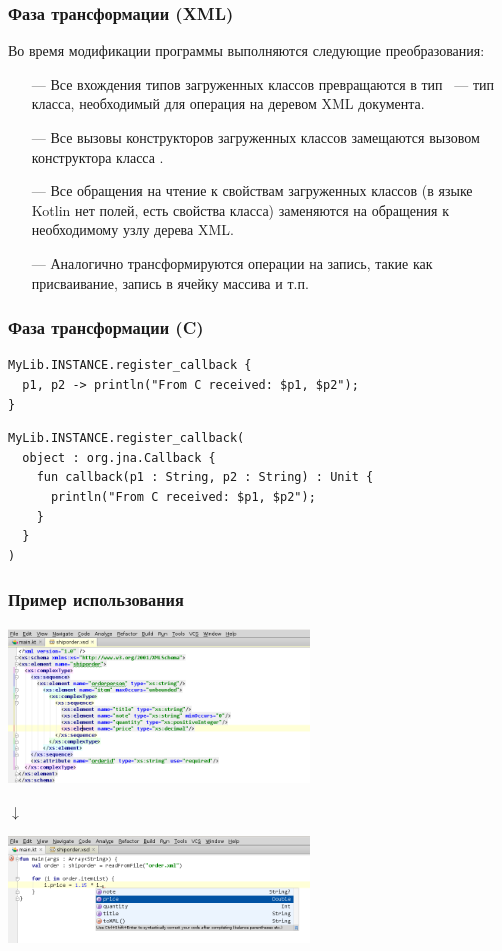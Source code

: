 \documentclass[12pt]{beamer}
\begin{document}
\begin{frame}\frametitle{Фаза трансформации (XML)}
Во время модификации программы выполняются следующие преобразования:
\begin{itemize}
\item[---] Все вхождения типов загруженных классов превращаются в тип ~--- тип класса, необходимый для операция на деревом XML документа.
\item[---] Все вызовы конструкторов загруженных классов замещаются вызовом конструктора класса .
\item[---] Все обращения на чтение к свойствам загруженных классов (в языке Kotlin нет полей, есть свойства класса) заменяются на обращения к необходимому узлу дерева XML.
\item[---] Аналогично трансформируются операции на запись, такие как присваивание, запись в ячейку массива и т.п.
\end{itemize}
\end{frame}

\begin{frame}[containsverbatim]\frametitle{Фаза трансформации (C)}
\begin{lstlisting}
MyLib.INSTANCE.register_callback {
  p1, p2 -> println("From C received: $p1, $p2");
}
\end{lstlisting}

\begin{lstlisting}
MyLib.INSTANCE.register_callback(
  object : org.jna.Callback {
    fun callback(p1 : String, p2 : String) : Unit {
      println("From C received: $p1, $p2");
    }
  }
)
\end{lstlisting}
\end{frame}

\begin{frame}\frametitle{Пример использования}
\begin{center}
    \includegraphics[height=4.132cm,width=8cm]{shiporder}

    {$\mathbf\downarrow$} %

    \includegraphics[height=2.829cm,width=8cm]{completion}
\end{center}
\end{frame}
\end{document}
